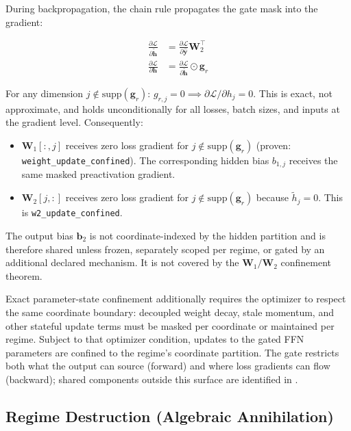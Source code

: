 \documentclass[11pt,a4paper]{article}
\newcommand{\bh}{\mathbf{h}}
\newcommand{\bW}{\mathbf{W}}
\newcommand{\bg}{\mathbf{g}}
\newcommand{\cL}{\mathcal{L}}
\begin{document}
During backpropagation, the chain rule propagates the gate mask
into the gradient:

\begin{align}
    \frac{\partial \cL}{\partial \tilde{\bh}} &=
    \frac{\partial \cL}{\partial \hat{\mathbf{y}}} \bW_2^\top \\
    \frac{\partial \cL}{\partial \bh} &=
    \frac{\partial \cL}{\partial \tilde{\bh}} \odot \bg_r
    \label{eq:grad-isolation}
\end{align}

For any dimension $j \notin \mathrm{supp}(\bg_r)$:
$g_{r,j} = 0 \implies \partial \cL / \partial h_j = 0$.
This is exact, not approximate, and holds unconditionally
for all losses, batch sizes, and inputs at the gradient level.
Consequently:

\begin{itemize}[nosep]
    \item $\bW_1[:,j]$ receives zero loss gradient for
    $j \notin \mathrm{supp}(\bg_r)$ (proven:
    \texttt{weight\_update\_confined}).
    The corresponding hidden bias $b_{1,j}$ receives the same masked
    preactivation gradient.
    \item $\bW_2[j,:]$ receives zero loss gradient for
    $j \notin \mathrm{supp}(\bg_r)$ because $\tilde{h}_j = 0$.
    This is \texttt{w2\_update\_}\allowbreak\texttt{confined}.
\end{itemize}

The output bias $\mathbf{b}_2$ is not coordinate-indexed by the
hidden partition and is therefore shared unless frozen, separately
scoped per regime, or gated by an additional declared mechanism.  It
is not covered by the $\bW_1/\bW_2$ confinement theorem.

Exact parameter-state confinement additionally requires the
optimizer to respect the same coordinate boundary: decoupled
weight decay, stale momentum, and other stateful update terms must
be masked per coordinate or maintained per regime.  Subject to
that optimizer condition, updates to the gated FFN parameters are
confined to the regime's coordinate partition.  The
gate restricts both what the output can source (forward) and where
loss gradients can flow (backward); shared components outside this
surface are identified in .

\subsection{Regime Destruction (Algebraic Annihilation)}
\label{sec:destruction}
\end{document}

